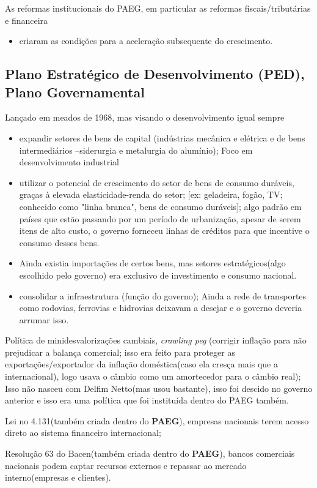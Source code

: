 \documentclass[a4paper,12pt]{article}[abntex2]
\begin{document}
As reformas institucionais do PAEG, em particular as reformas fiscais/tributárias e financeira\begin{itemize}
    \item criaram as condições para a aceleração subsequente do crescimento.
\end{itemize}

\subsection{\textbf{Plano Estratégico de Desenvolvimento (PED), Plano Governamental }}
Lançado em meados de 1968, mas visando o desenvolvimento igual sempre\begin{itemize}
    \item expandir setores de bens de capital (indústrias mecânica e elétrica  e de bens intermediários –siderurgia e metalurgia do alumínio); Foco em desenvolvimento industrial
    \item utilizar o potencial de crescimento do setor de bens de consumo duráveis, graças à elevada elasticidade-renda do setor; [ex: geladeira, fogão, TV; conhecido como "linha branca", bens de consumo duráveis]; algo padrão em países que estão passando por um período de urbanização, apesar de serem itens de alto custo, o governo forneceu linhas de créditos para que incentive o consumo desses bens.
    \item Ainda existia importações de certos bens, mas setores estratégicos(algo escolhido pelo governo) era exclusivo de investimento e consumo nacional.
    \item consolidar a infraestrutura (função do governo); Ainda a rede de transportes como rodovias, ferrovias e hidrovias deixavam a desejar e o governo deveria arrumar isso.
\end{itemize}

Política de minidesvalorizações cambiais, \textit{crawling peg} (corrigir inflação para não prejudicar a balança comercial; isso era feito para proteger as exportações/exportador da inflação doméstica(caso ela cresça mais que a internacional), logo usava o câmbio como um amortecedor para o câmbio real); Isso não nasceu com Delfim Netto(mas usou bastante), isso foi descido no governo anterior e isso era uma política que foi instituída dentro do PAEG também.

Lei no 4.131(também criada dentro do \textbf{PAEG}), empresas nacionais terem acesso direto ao sistema financeiro internacional;

Resolução 63 do Bacen(também criada dentro do \textbf{PAEG}), bancos comerciais nacionais podem captar recursos externos e repassar ao mercado interno(empresas e clientes).
\end{document}

